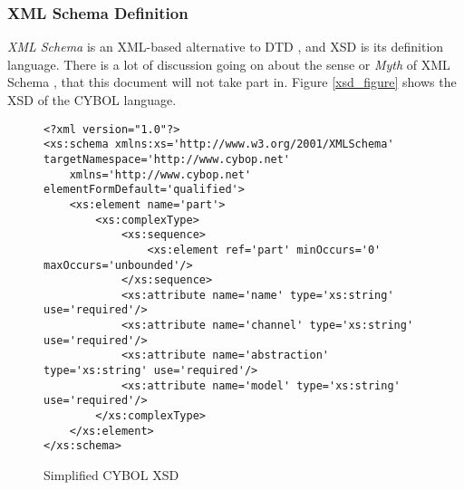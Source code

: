 %
%
%
%
%
%
%

\subsubsection{XML Schema Definition}
\label{xml_schema_definition_heading}

\emph{XML Schema} is an XML-based alternative to DTD \cite{w3schools}, and XSD
is its definition language. There is a lot of discussion going on about the
sense or \emph{Myth} of XML Schema \cite{browne}, that this document will not
take part in. Figure \ref{xsd_figure} shows the XSD of the CYBOL language.

\begin{figure}[ht]
    \bigskip
    \bigskip
    \begin{scriptsize}
        \begin{verbatim}
<?xml version="1.0"?>
<xs:schema xmlns:xs='http://www.w3.org/2001/XMLSchema' targetNamespace='http://www.cybop.net'
    xmlns='http://www.cybop.net' elementFormDefault='qualified'>
    <xs:element name='part'>
        <xs:complexType>
            <xs:sequence>
                <xs:element ref='part' minOccurs='0' maxOccurs='unbounded'/>
            </xs:sequence>
            <xs:attribute name='name' type='xs:string' use='required'/>
            <xs:attribute name='channel' type='xs:string' use='required'/>
            <xs:attribute name='abstraction' type='xs:string' use='required'/>
            <xs:attribute name='model' type='xs:string' use='required'/>
        </xs:complexType>
    </xs:element>
</xs:schema>
        \end{verbatim}
    \end{scriptsize}
    \caption{Simplified CYBOL XSD}
    \label{simplexsd_figure}
\end{figure}

